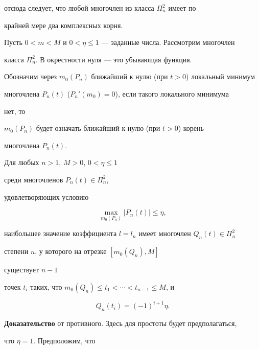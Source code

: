 отсюда следует, что любой многочлен из класса $\Pi^2_n$ имеет по


крайней мере два комплексных корня.


Пусть $0<m<M$ и $0<\eta\le 1$ --- заданные числа. Рассмотрим многочлен


класса $\Pi^2_n$. В окрестности нуля --- это убывающая функция.


Обозначим через $m_0(P_n)$ ближайший к нулю (при $t>0$) локальный минимум


многочлена $P_n(t)$ ($P_n'(m_0) =0$), если такого локального минимума


нет, то


$m_0(P_n)$ будет означать ближайший к нулю (при $t>0$) корень


многочлена $P_n(t)$.





\begin{lems} Для любых $n>1$, $M>0$, $0<\eta\le 1$


среди многочленов $P_n(t) \in \Pi^2_n$,


удовлетворяющих условию


\begin{equation}


\max_{m_0(P_n)} |P_n(t)|\le \eta,


\label{27}


\end{equation}


наибольшее значение коэффициента $l=l_n$ имеет многочлен $Q_n(t)\in\Pi^2_n$


степени $n$, у которого на отрезке $[m_0(Q_n),M]$


существует $n-1$


точек $t_i$ таких, что $m_0(Q_n)\le t_1 <\dotsb <t_{n-1}\le M$, и


\begin{equation}


Q_n(t_i)=(-1)^{i+1} \eta.


\label{28}


\end{equation}


\end{lems}





{\bf Доказательство} от противного. Здесь для простоты будет предполагаться,


что $\eta=1$. Предположим, что


